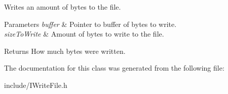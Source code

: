 Writes an amount of bytes to the file. 


\begin{DoxyParams}{Parameters}
{\em buffer} & Pointer to buffer of bytes to write. \\
\hline
{\em size\+To\+Write} & Amount of bytes to write to the file. \\
\hline
\end{DoxyParams}
\begin{DoxyReturn}{Returns}
How much bytes were written. 
\end{DoxyReturn}


The documentation for this class was generated from the following file\+:\begin{DoxyCompactItemize}
\item 
include/I\+Write\+File.\+h\end{DoxyCompactItemize}
